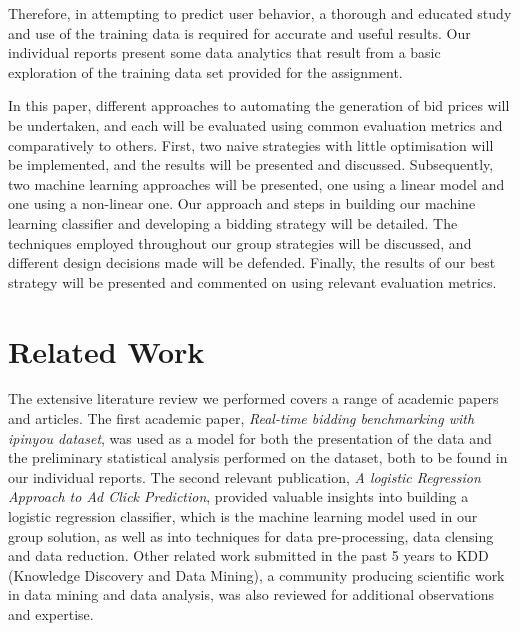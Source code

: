 \documentclass{sig-alternate-05-2015}
\begin{document}
Therefore, in attempting to predict user behavior, a thorough and educated study and use of the training data is required for accurate and useful results. Our individual reports present some data analytics that result from a basic exploration of the training data set provided for the assignment. 

In this paper, different approaches to automating the generation of bid prices will be undertaken, and each will be evaluated using common evaluation metrics and comparatively to others. First, two naive strategies with little optimisation will be implemented, and the results will be presented and discussed. Subsequently, two machine learning approaches will be presented, one using a linear model and one using a non-linear one. Our approach and steps in building our machine learning classifier and developing a bidding strategy will be detailed. The techniques employed throughout our group strategies will be discussed, and different design decisions made will be defended. Finally, the results of our best strategy will be presented and commented on using relevant evaluation metrics.

\section{Related Work}
The extensive literature review we performed covers a range of academic papers and articles. The first academic paper, \textit{Real-time bidding benchmarking with ipinyou dataset}, was used as a model for both the presentation of the data and the preliminary statistical analysis performed on the dataset, both to be found in our individual reports. The second relevant publication, \textit{A logistic Regression Approach to Ad Click Prediction}, provided valuable insights into building a logistic regression classifier, which is the machine learning model used in our group solution, as well as into techniques for data pre-processing, data clensing and data reduction. Other related work submitted in the past 5 years to KDD (Knowledge Discovery and Data Mining), a community producing scientific work in data mining and data analysis, was also reviewed for additional observations and expertise.
\end{document}

